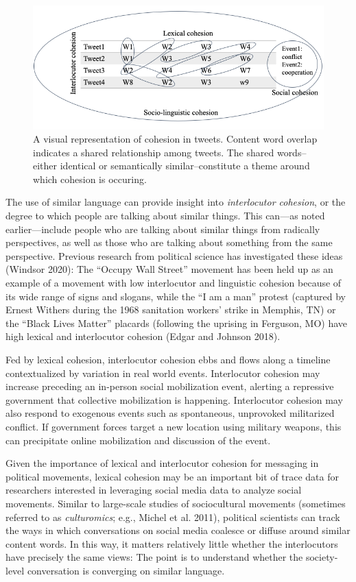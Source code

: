 \documentclass[
  english,
  man]{apa6}
\begin{document}
\begin{figure}
\includegraphics[width=1\linewidth]{./figs/cohesion-in-tweets} \caption{A visual representation of cohesion in tweets. Content word overlap indicates a shared relationship among tweets. The shared words--either identical or semantically similar--constitute a theme around which cohesion is occuring.}\label{fig:cohesion-in-tweets}
\end{figure}

The use of similar language can provide insight into \emph{interlocutor cohesion}, or
the degree to which people are talking about similar things. This can---as noted
earlier---include people who are talking about similar things from radically
perspectives, as well as those who are talking about something from the same
perspective. Previous research from political science has investigated these
ideas (Windsor 2020): The \enquote{Occupy Wall Street} movement has been held up as an
example of a movement with low interlocutor and linguistic cohesion because of
its wide range of signs and slogans, while the \enquote{I am a man} protest (captured by
Ernest Withers during the 1968 sanitation workers' strike in Memphis, TN) or the
\enquote{Black Lives Matter} placards (following the uprising in Ferguson, MO) have high
lexical and interlocutor cohesion (Edgar and Johnson 2018).

Fed by lexical cohesion, interlocutor cohesion ebbs and flows along a timeline
contextualized by variation in real world events. Interlocutor cohesion may
increase preceding an in-person social mobilization event, alerting a repressive
government that collective mobilization is happening. Interlocutor cohesion may
also respond to exogenous events such as spontaneous, unprovoked militarized
conflict. If government forces target a new location using military weapons,
this can precipitate online mobilization and discussion of the event.

Given the importance of lexical and interlocutor cohesion for messaging in
political movements, lexical cohesion may be an important bit of trace data for
researchers interested in leveraging social media data to analyze social
movements. Similar to large-scale studies of sociocultural movements (sometimes
referred to as \emph{culturomics}; e.g., Michel et al. 2011), political
scientists can track the ways in which conversations on social media coalesce or
diffuse around similar content words. In this way, it matters relatively little
whether the interlocutors have precisely the same views: The point is to
understand whether the society-level conversation is converging on similar
language.
\end{document}
